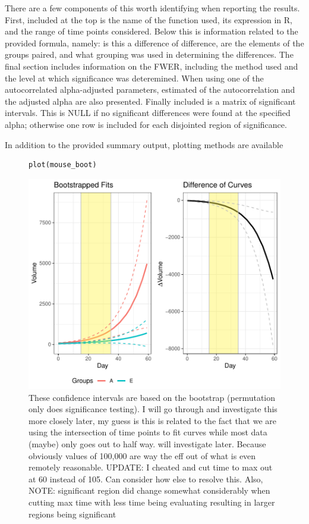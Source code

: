 \documentclass{article}
\begin{document}
There are a few components of this worth identifying when reporting the results. First, included at the top is the name of the function used, its expression in R, and the range of time points considered. Below this is information related to the provided formula, namely: is this a difference of difference, are the elements of the groups paired, and what grouping was used in determining the differences. The final section includes information on the FWER, including the method used and the level at which significance was deteremined. When using one of the autocorrelated alpha-adjusted parameters, estimated of the autocorrelation and the adjusted alpha are also presented. Finally included is a matrix of significant intervals. This is NULL if no significant differences were found at the specified alpha; otherwise one row is included for each disjointed region of significance. 

In addition to the provided summary output, plotting methods are available

\begin{figure}[H]
\centering
\begin{BVerbatim}
plot(mouse_boot)
\end{BVerbatim}

\includegraphics{img/mouse_boot_plot.pdf}
\caption{These confidence intervals are based on the bootstrap (permutation only does significance testing). I will go through and investigate this more closely later, my guess is this is related to the fact that we are using the intersection of time points to fit curves while most data (maybe) only goes out to half way. will investigate later. Because obviously values of 100,000 are way the eff out of what is even remotely reasonable. UPDATE: I cheated and cut time to max out at 60 instead of 105. Can consider how else to resolve this. Also, NOTE: significant region did change somewhat considerably when cutting max time with less time being evaluating resulting in larger regions being significant}
\end{figure}
\end{document}
